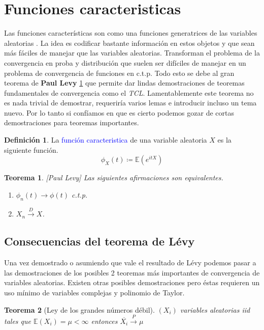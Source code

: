\documentclass[11pt]{article}
\theoremstyle{plain} %
\newtheorem{teorema}{Teorema}
\theoremstyle{definition}
\newtheorem*{definicion}{Definici\'{o}n} %
\theoremstyle{remark}
\def\E{\mathbb{E}}
\def\va{variable aleatoria }
\def\vas{variables aleatorias }
\def\blue{\textcolor{blue}}
\newcommand{\proba}{\overset{P}{\to}}
\newcommand{\dist}{\overset{D}{\to}}
\begin{document}
\bigskip
\section{Funciones caracteristicas}

Las funciones características son como una funciones generatrices de las \vas. La idea es codificar bastante información en estos objetos y que sean más fáciles de manejar que las variables aleatorias. Transforman el problema de la convergencia en proba y distribución que suelen ser difíciles de manejar en un problema de convergencia de funciones en c.t.p. Todo esto se debe al gran teorema de \textbf{Paul Levy} \ref{teo:levy} que permite dar lindas demostraciones de teoremas fundamentales de convergencia como el \textit{TCL}. Lamentablemente este teorema no es nada trivial de demostrar, requeriría varios lemas e introducir incluso un tema nuevo. Por lo tanto si confíamos en que es cierto podemos gozar de cortas demostraciones para teoremas importantes.

\begin{definicion}
	La \blue{función caracteristica} de una \va $X$ es la siguiente función. 
	\[ \phi_{X}(t) \coloneqq \E(e^{itX}) \]
\end{definicion}

\begin{teorema}
	\label{teo:levy}
	[Paul Levy]
	Las siguientes afirmaciones son equivalentes.
	\begin{enumerate}
		\item $\phi_{n}(t) \to \phi(t)$ c.t.p.
		\item $X_n \dist X$.
	\end{enumerate}
\end{teorema}


\subsection{Consecuencias del teorema de Lévy}

Una vez demostrado o asumiendo que vale el resultado de Lévy podemos pasar a las demostraciones de los posibles 2 teoremas más importantes de convergencia de variables aleatorias. Existen otras posibles demostraciones pero éstas requieren un uso mínimo de variables complejas y polinomio de Taylor.

\begin{teorema}
	[Ley de los grandes números débil]
	$(X_i) $ \vas iid tales que $\E(X_i) = \mu < \infty$ entonces $\overline{X_i} \proba \mu$
\end{teorema}
\end{document}
